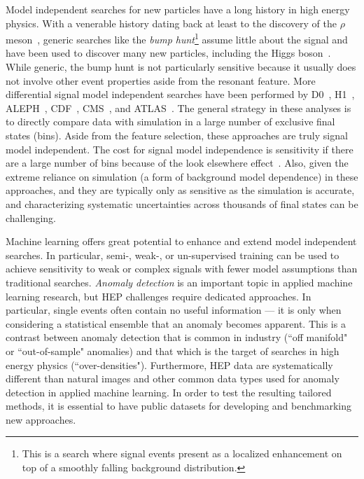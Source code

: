 \documentclass[a4paper,11pt]{article}
\begin{document}
Model independent searches for new particles have a long history in high energy physics.  
With a venerable history dating back at least to the discovery of the $\rho$ meson~\cite{Button:1962bnf},
generic searches like the \textit{bump hunt}\footnote{This is a search where signal events present as a localized enhancement on top of a smoothly falling background distribution.} assume little about the signal and have been used to discover many new particles, including the Higgs boson~\cite{Aad:2012tfa,Chatrchyan:2012ufa}.  While generic, the bump hunt is not particularly sensitive because it usually does not involve other event properties aside from the resonant feature.  More differential signal model independent searches have been performed by D0~\cite{sleuth,Abbott:2000fb,Abbott:2000gx,Abbott:2001ke}, H1~\cite{Aaron:2008aa,Aktas:2004pz}, ALEPH~\cite{Cranmer:2005zn}, CDF~\cite{Aaltonen:2007dg,Aaltonen:2007ab,Aaltonen:2008vt}, CMS~\cite{CMS-PAS-EXO-14-016,CMS-PAS-EXO-10-021,CMS:2020ohc,Sirunyan:2020jwk}, and ATLAS~\cite{Aaboud:2018ufy,ATLAS-CONF-2014-006,ATLAS-CONF-2012-107}.  The general strategy in these analyses is to directly compare data with simulation in a large number of exclusive final states (bins).  Aside from the feature selection, these approaches are truly signal model independent.  The cost for signal model independence is sensitivity if there are a large number of bins because of the look elsewhere effect~\cite{Gross:2010qma}. Also, given the extreme reliance on simulation (a form of background model dependence) in these approaches, and they are typically only as sensitive as the simulation is accurate, and characterizing systematic uncertainties across thousands of final states can be challenging. 

Machine learning offers great potential to enhance and extend model independent searches.  In particular, semi-, weak-, or un-supervised training can be used to achieve sensitivity to weak or complex signals with fewer model assumptions than traditional searches.   \textit{Anomaly detection} is an important topic in applied machine learning research, but HEP challenges require dedicated approaches.   In particular, single events often contain no useful information --- it is only when considering a statistical ensemble that an anomaly becomes apparent.  This is a contrast between anomaly detection that is common in industry (``off manifold" or ``out-of-sample" anomalies) and that which is the target of searches in high energy physics (``over-densities").  Furthermore, HEP data are systematically different than natural images and other common data types used for anomaly detection in applied machine learning.  In order to test the resulting tailored methods, it is essential to have public datasets for developing and benchmarking new approaches. 
\end{document}

